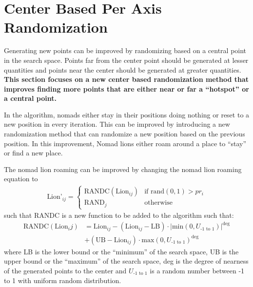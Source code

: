 \section{Center Based Per Axis Randomization}
\par Generating new points can be improved by randomizing based on a central point in the search space. Points far from the center point should be generated at lesser quantities and points near the center should be generated at greater quantities. \textbf{This section focuses on a new center based randomization method that improves finding more points that are either near or far a ``hotspot'' or a central point.}

\par In the algorithm, nomads either stay in their positions doing nothing or reset to a new position in every iteration. This can be improved by introducing a new randomization method that can randomize a new position based on the previous position. In this improvement, Nomad lions either roam around a place to ``stay'' or find a new place.

\par The nomad lion roaming can be improved by changing the nomad lion roaming equation to
\begin{align*}
 \text{Lion'}_{ij} =
  \begin{cases}
   \text{RANDC}(\text{Lion}_{ij})        & \text{if rand}(0,1)  > pr_i \\
   \text{RAND}_j        & \text{otherwise}
 \end{cases}
\end{align*}
such that RANDC is a new function to be added to the algorithm such that:
\begin{align*}
\text{RANDC}(\text{Lion}_ij) &= \text{Lion}_{ij} - (\text{Lion}_{ij} - \text{LB}) \cdot |\text{min}(0, U_\text{-1 to 1})|^\text{deg} \\
 & + (\text{UB} - \text{Lion}_{ij}) \cdot \text{max}(0, U_\text{-1 to 1})^{\text{deg}}
\end{align*}
where LB is the lower bound or the ``minimum'' of the search space, UB is the upper bound or the ``maximum'' of the search space, deg is the degree of nearness of the generated points to the center and $U_\text{-1 to 1}$ is a random number between -1 to 1 with uniform random distribution.

